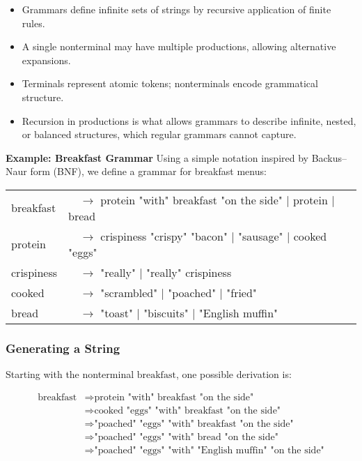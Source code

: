 \documentclass[12pt,a4paper]{article}
\newcommand{\newpar} {
  \vspace{1em}
  \noindent
}
\begin{document}
\begin{itemize}
	\item Grammars define infinite sets of strings by recursive application of finite rules.
	\item A single nonterminal may have multiple productions, allowing alternative expansions.
	\item Terminals represent atomic tokens; nonterminals encode grammatical structure.
	\item Recursion in productions is what allows grammars to describe infinite, nested, or balanced structures, which regular grammars cannot capture.
\end{itemize}

\newpar
\textbf{Example: Breakfast Grammar}
Using a simple notation inspired by Backus–Naur form (BNF), we define a grammar for breakfast menus:


\newpar
\begin{tabular}{@{}l@{}l@{}}
	breakfast  & $\quad \rightarrow$ protein "with" breakfast "on the side" $|$ protein $|$ bread \\
	protein    & $\quad \rightarrow$ crispiness "crispy" "bacon" $|$ "sausage" $|$ cooked "eggs"  \\
	crispiness & $\quad \rightarrow$ "really" $|$ "really" crispiness                             \\
	cooked     & $\quad \rightarrow$ "scrambled" $|$ "poached" $|$ "fried"                        \\
	bread      & $\quad \rightarrow$ "toast" $|$ "biscuits" $|$ "English muffin"                  \\
\end{tabular}


\subsubsection*{Generating a String}
Starting with the nonterminal \(\text{breakfast}\), one possible derivation is:

\[
	\begin{aligned}
		\text{breakfast} & \Rightarrow \text{protein "with" breakfast "on the side"}                 \\
		                 & \Rightarrow \text{cooked "eggs" "with" breakfast "on the side"}           \\
		                 & \Rightarrow \text{"poached" "eggs" "with" breakfast "on the side"}        \\
		                 & \Rightarrow \text{"poached" "eggs" "with" bread "on the side"}            \\
		                 & \Rightarrow \text{"poached" "eggs" "with" "English muffin" "on the side"} \\
	\end{aligned}
\]
\end{document}

